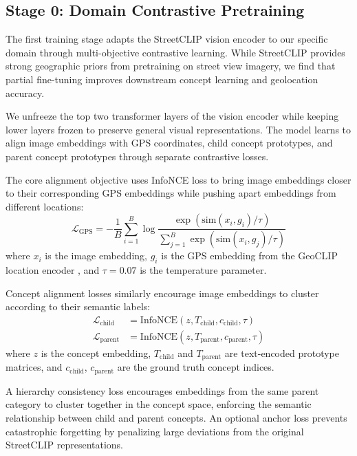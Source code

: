 \documentclass{uva-inf-article}
\begin{document}
\subsection{Stage 0: Domain Contrastive Pretraining}

The first training stage adapts the StreetCLIP vision encoder to our specific domain through multi-objective contrastive learning. While StreetCLIP provides strong geographic priors from pretraining on street view imagery, we find that partial fine-tuning improves downstream concept learning and geolocation accuracy.

We unfreeze the top two transformer layers of the vision encoder while keeping lower layers frozen to preserve general visual representations. The model learns to align image embeddings with GPS coordinates, child concept prototypes, and parent concept prototypes through separate contrastive losses.

The core alignment objective uses InfoNCE loss \parencite{oord2018infonce} to bring image embeddings closer to their corresponding GPS embeddings while pushing apart embeddings from different locations:
\begin{equation}
\mathcal{L}_{\text{GPS}} = -\frac{1}{B}\sum_{i=1}^{B}\log\frac{\exp(\text{sim}(x_i, g_i)/\tau)}{\sum_{j=1}^{B}\exp(\text{sim}(x_i, g_j)/\tau)}
\end{equation}
where $x_i$ is the image embedding, $g_i$ is the GPS embedding from the GeoCLIP location encoder \parencite{cepeda2023geoclip}, and $\tau = 0.07$ is the temperature parameter.

Concept alignment losses similarly encourage image embeddings to cluster according to their semantic labels:
\begin{align}
\mathcal{L}_{\text{child}} &= \text{InfoNCE}(z, T_{\text{child}}, c_{\text{child}}, \tau) \\
\mathcal{L}_{\text{parent}} &= \text{InfoNCE}(z, T_{\text{parent}}, c_{\text{parent}}, \tau)
\end{align}
where $z$ is the concept embedding, $T_{\text{child}}$ and $T_{\text{parent}}$ are text-encoded prototype matrices, and $c_{\text{child}}$, $c_{\text{parent}}$ are the ground truth concept indices.

A hierarchy consistency loss encourages embeddings from the same parent category to cluster together in the concept space, enforcing the semantic relationship between child and parent concepts. An optional anchor loss prevents catastrophic forgetting by penalizing large deviations from the original StreetCLIP representations.
\end{document}
